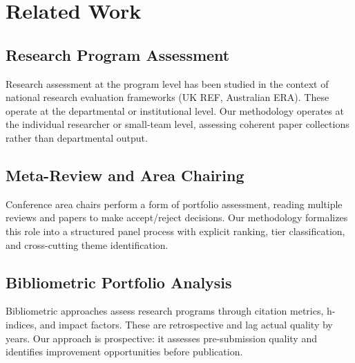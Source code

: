 \section{Related Work}

\subsection{Research Program Assessment}

Research assessment at the program level has been studied in the context of national research evaluation frameworks (UK REF, Australian ERA). These operate at the departmental or institutional level. Our methodology operates at the individual researcher or small-team level, assessing coherent paper collections rather than departmental output.

\subsection{Meta-Review and Area Chairing}

Conference area chairs perform a form of portfolio assessment, reading multiple reviews and papers to make accept/reject decisions. Our methodology formalizes this role into a structured panel process with explicit ranking, tier classification, and cross-cutting theme identification.

\subsection{Bibliometric Portfolio Analysis}

Bibliometric approaches assess research programs through citation metrics, h-indices, and impact factors. These are retrospective and lag actual quality by years. Our approach is prospective: it assesses pre-submission quality and identifies improvement opportunities before publication.
